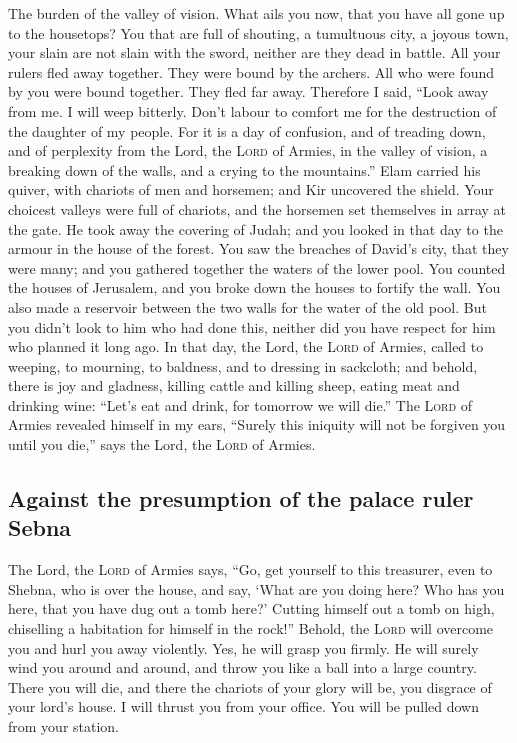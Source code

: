  The burden of the valley of vision. What ails you now,
that you have all gone up to the housetops?  You that are
full of shouting, a tumultuous city, a joyous town, your slain are not
slain with the sword, neither are they dead in battle. 
All your rulers fled away together. They were bound by the archers. All
who were found by you were bound together. They fled far away.
 Therefore I said, ``Look away from me. I will weep
bitterly. Don't labour to comfort me for the destruction of the daughter
of my people.  For it is a day of confusion, and of
treading down, and of perplexity from the Lord, the \textsc{Lord} of
Armies, in the valley of vision, a breaking down of the walls, and a
crying to the mountains.''  Elam carried his quiver, with
chariots of men and horsemen; and Kir uncovered the shield.
 Your choicest valleys were full of chariots, and the
horsemen set themselves in array at the gate.  He took
away the covering of Judah; and you looked in that day to the armour in
the house of the forest.  You saw the breaches of David's
city, that they were many; and you gathered together the waters of the
lower pool.  You counted the houses of Jerusalem, and you
broke down the houses to fortify the wall.  You also made
a reservoir between the two walls for the water of the old pool. But you
didn't look to him who had done this, neither did you have respect for
him who planned it long ago.  In that day, the Lord, the
\textsc{Lord} of Armies, called to weeping, to mourning, to baldness,
and to dressing in sackcloth;  and behold, there is joy
and gladness, killing cattle and killing sheep, eating meat and drinking
wine: ``Let's eat and drink, for tomorrow we will die.'' 
The \textsc{Lord} of Armies revealed himself in my ears, ``Surely this
iniquity will not be forgiven you until you die,'' says the Lord, the
\textsc{Lord} of Armies.

\hypertarget{against-the-presumption-of-the-palace-ruler-sebna}{%
\subsection{Against the presumption of the palace ruler
Sebna}\label{against-the-presumption-of-the-palace-ruler-sebna}}

 The Lord, the \textsc{Lord} of Armies says, ``Go, get
yourself to this treasurer, even to Shebna, who is over the house, and
say,  `What are you doing here? Who has you here, that
you have dug out a tomb here?' Cutting himself out a tomb on high,
chiselling a habitation for himself in the rock!'' 
Behold, the \textsc{Lord} will overcome you and hurl you away violently.
Yes, he will grasp you firmly.  He will surely wind you
around and around, and throw you like a ball into a large country. There
you will die, and there the chariots of your glory will be, you disgrace
of your lord's house.  I will thrust you from your
office. You will be pulled down from your station.

